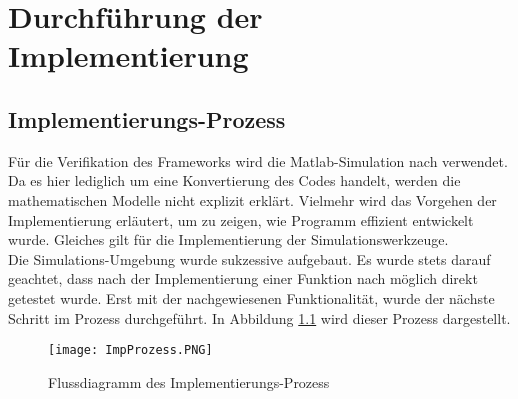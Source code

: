 \chapter{Durchführung der Implementierung}
\section{Implementierungs-Prozess}
Für die Verifikation des Frameworks wird die Matlab-Simulation nach \cite{Olucak.15.02.2017} verwendet. Da es hier lediglich um eine Konvertierung des Codes handelt, werden die mathematischen Modelle nicht explizit erklärt. Vielmehr wird das Vorgehen der Implementierung erläutert, um zu zeigen, wie Programm effizient entwickelt wurde. Gleiches gilt für die Implementierung der Simulationswerkzeuge.\\
 Die Simulations-Umgebung wurde sukzessive aufgebaut. Es wurde stets darauf geachtet, dass nach der Implementierung einer Funktion nach möglich direkt getestet wurde. Erst mit der nachgewiesenen Funktionalität, wurde der nächste Schritt im Prozess durchgeführt. In Abbildung \ref{fig:ImpProzess} wird dieser Prozess dargestellt.
\begin{figure}[h]
	\texttt{[image: ImpProzess.PNG]}
	\label{fig:ImpProzess}
	\caption{Flussdiagramm des Implementierungs-Prozess}
\end{figure}
